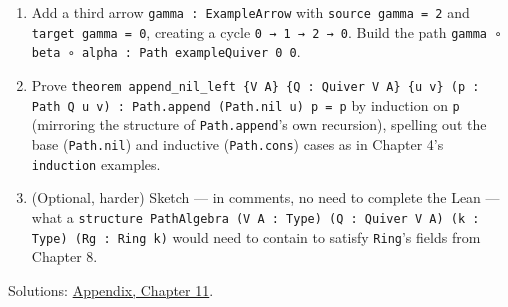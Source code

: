 \begin{enumerate}
\item
  Add a third arrow \texttt{gamma : ExampleArrow} with \texttt{source gamma = 2} and \texttt{target gamma = 0}, creating a cycle \texttt{0 → 1 → 2 → 0}. Build the path \texttt{gamma ∘ beta ∘ alpha : Path exampleQuiver 0 0}.
\item
  Prove \texttt{theorem append\_\allowbreak{}nil\_\allowbreak{}left \{V A\} \{Q : Quiver V A\} \{u v\} (p : Path Q u v) : Path.append (Path.nil u) p = p} by induction on \texttt{p} (mirroring the structure of \texttt{Path.append}'s own recursion), spelling out the base (\texttt{Path.nil}) and inductive (\texttt{Path.cons}) cases as in Chapter 4's \texttt{induction} examples.
\item
  (Optional, harder) Sketch --- in comments, no need to complete the Lean --- what a \texttt{structure PathAlgebra (V A : Type) (Q : Quiver V A) (k : Type) (Rg : Ring k)} would need to contain to satisfy \texttt{Ring}'s fields from Chapter 8.
\end{enumerate}

Solutions: \hyperref[sec:14-appendix-solutions:10-chapter-11:1]{Appendix, Chapter 11}.

